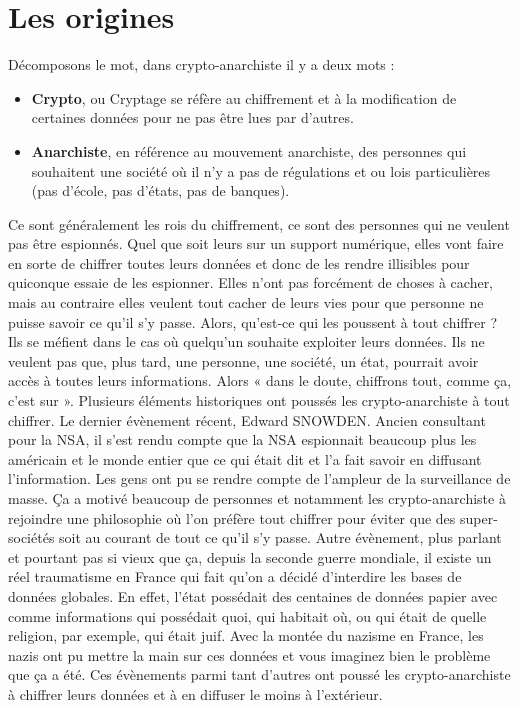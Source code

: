 \documentclass{bredele} %
\begin{document}
    \section*{Les origines}
    Décomposons le mot, dans crypto-anarchiste il y a deux mots :
    \begin{itemize}
        \item \textbf{Crypto}, ou Cryptage se réfère au chiffrement et à la modification de certaines données pour ne pas être lues par d’autres.
        \item \textbf{Anarchiste}, en référence au mouvement anarchiste, des personnes qui souhaitent une société où il n’y a pas de régulations et ou lois particulières (pas d’école, pas d’états, pas de banques).
    \end{itemize}
    Ce sont généralement les rois du chiffrement, ce sont des personnes qui ne veulent pas être espionnés. Quel que soit leurs sur un support numérique, elles vont faire en sorte de chiffrer toutes leurs données et donc de les rendre illisibles pour quiconque essaie de les espionner. \newline
    Elles n’ont pas forcément de choses à cacher, mais au contraire elles veulent tout cacher de leurs vies pour que personne ne puisse savoir ce qu’il s’y passe.
    \newline
    Alors, qu’est-ce qui les poussent à tout chiffrer ? Ils se méfient dans le cas où quelqu’un souhaite exploiter leurs données. Ils ne veulent pas que, plus tard, une personne, une société, un état, pourrait avoir accès à toutes leurs informations. Alors « dans le doute, chiffrons tout, comme ça, c’est sur ».
    \newline
    Plusieurs éléments historiques ont poussés les crypto-anarchiste à tout chiffrer.
    \newline
    \newline
    Le dernier évènement récent, Edward SNOWDEN. Ancien consultant pour la NSA, il s’est rendu compte que la NSA espionnait beaucoup plus les américain et le monde entier que ce qui était dit et l’a fait savoir en diffusant l’information. Les gens ont pu se rendre compte de l’ampleur de la surveillance de masse. Ça a motivé beaucoup de personnes et notamment les crypto-anarchiste à rejoindre une philosophie où l’on préfère tout chiffrer pour éviter que des super-sociétés soit au courant de tout ce qu’il s’y passe.
    \newline
    \newline
    Autre évènement, plus parlant et pourtant pas si vieux que ça, depuis la seconde guerre mondiale, il existe un réel traumatisme en France qui fait qu’on a décidé d’interdire les bases de données globales. En effet, l’état possédait des centaines de données papier avec comme informations qui possédait quoi, qui habitait où, ou qui était de quelle religion, par exemple, qui était juif. Avec la montée du nazisme en France, les nazis ont pu mettre la main sur ces données et vous imaginez bien le problème que ça a été.
    \newline
    \newline
    Ces évènements parmi tant d’autres ont poussé les crypto-anarchiste à chiffrer leurs données et à en diffuser le moins à l’extérieur.
\end{document}
